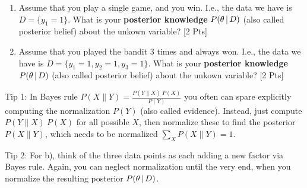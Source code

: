 \begin{enumerate}
	\item Assume that you play a single game, and you win. I.e., the data we have is $D = \{ y_1=1 \}$. What is your \textbf{posterior knowledge} $P(\theta \,|\, D)$ (also called posterior belief) about the unkown variable? [2 Pts]

	\item Assume that you played the bandit 3 times and always won. I.e., the data we have is $D = \{ y_1=1, y_2=1, y_3=1 \}$. What is your \textbf{posterior knowledge} $P(\theta \,|\, D)$ (also called posterior belief) about the unkown variable? [2 Pts]
\end{enumerate}

Tip 1: In Bayes rule $P(X \| Y) = \frac{P(Y \| X)~ P(X)}{P(Y)}$ you often can spare explicitly computing the normalization $P(Y)$ (also called evidence). Instead, just compute $P(Y \| X)~ P(X)$ for all possible $X$, then normalize these to find the posterior $P(X \| Y)$, which needs to be normalized $\sum_X P(X \| Y) = 1$.

Tip 2: For b), think of the three data points as each adding a new factor via Bayes rule. Again, you can neglect normalization until the very end, when you normalize the resulting posterior $P(\theta \,|\, D)$.


